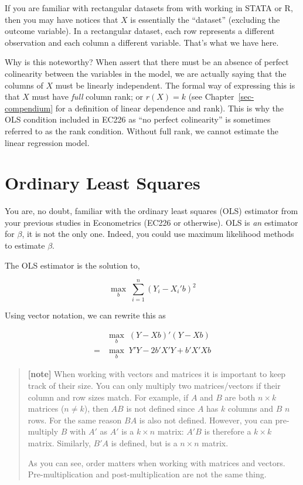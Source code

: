 \documentclass[
  letterpaper,
  DIV=11,
  numbers=noendperiod]{scrreprt}
\begin{document}
If you are familiar with rectangular datasets from with working in STATA
or R, then you may have notices that \(X\) is essentially the
``dataset'' (excluding the outcome variable). In a rectangular dataset,
each row represents a different observation and each column a different
variable. That's what we have here.

Why is this noteworthy? When assert that there must be an absence of
perfect colinearity between the variables in the model, we are actually
saying that the columns of \(X\) must be linearly independent. The
formal way of expressing this is that \(X\) must have \emph{full} column
rank; or \(r(X)=k\) (see Chapter~\ref{sec-compendium} for a definition
of linear dependence and rank). This is why the OLS condition included
in EC226 as ``no perfect colinearity'' is sometimes referred to as the
rank condition. Without full rank, we cannot estimate the linear
regression model.


\hypertarget{ordinary-least-squares}{%
\chapter{Ordinary Least Squares}\label{ordinary-least-squares}}

You are, no doubt, familiar with the ordinary least squares (OLS)
estimator from your previous studies in Econometrics (EC226 or
otherwise). OLS is \emph{an} estimator for \(\beta\), it is not the only
one. Indeed, you could use maximum likelihood methods to estimate
\(\beta\).

The OLS estimator is the solution to,

\[ \max_b\;\sum_{i=1}^n(Y_i-X_i'b)^2 \]

Using vector notation, we can rewrite this as

\[ \begin{align} &\max_b\;(Y-Xb)'(Y-Xb)\\ =&\max_b\;Y'Y-2b'X'Y+b'X'Xb \end{align} \]

\begin{quote}
\textbf{{[}note{]}} When working with vectors and matrices it is
important to keep track of their size. You can only multiply two
matrices/vectors if their column and row sizes match. For example, if
\(A\) and \(B\) are both \(n\times k\) matrices (\(n\neq k\)), then
\(AB\) is not defined since \(A\) has \(k\) columns and \(B\) \(n\)
rows. For the same reason \(BA\) is also not defined. However, you can
pre-multiply \(B\) with \(A'\) as \(A'\) is a \(k\times n\) matrix:
\(A'B\) is therefore a \(k\times k\) matrix. Similarly, \(B'A\) is
defined, but is a \(n\times n\) matrix.

As you can see, order matters when working with matrices and vectors.
Pre-multiplication and post-multiplication are not the same thing.
\end{quote}
\end{document}
